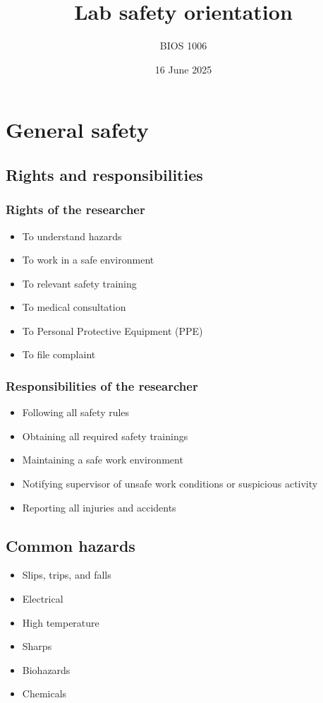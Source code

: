 \documentclass[a4paper, 12pt]{article}
\title{Lab safety orientation}
\author{BIOS 1006}
\date{16 June 2025}
\begin{document}
\maketitle

\section*{General safety}

\subsection*{Rights and responsibilities}

\subsubsection*{Rights of the researcher}

\begin{itemize}
\item To understand hazards
\item To work in a safe environment
\item To relevant safety training
\item To medical consultation
\item To Personal Protective Equipment (PPE)
\item To file complaint
\end{itemize}

\subsubsection*{Responsibilities of the researcher}

\begin{itemize}
\item Following all safety rules
\item Obtaining all required safety trainings
\item Maintaining a safe work environment 
\item Notifying supervisor of unsafe work conditions or suspicious activity
\item Reporting all injuries and accidents
\end{itemize}

\subsection*{Common hazards}

\begin{itemize}
\item Slips, trips, and falls
\item Electrical
\item High temperature 
\item Sharps
\item Biohazards
\item Chemicals
\end{itemize}
\end{document}
